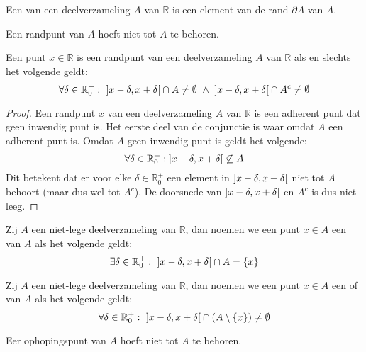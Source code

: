 \documentclass[main.tex]{subfiles}
\begin{document}
\begin{de}
  Een  van een deelverzameling $A$ van $\mathbb{R}$ is een element van de rand $\partial A$ van $A$.
\end{de}

\begin{opm}
  Een randpunt van $A$ hoeft niet tot $A$ te behoren.
\end{opm}

\begin{st}
  Een punt $x\in \mathbb{R}$ is een randpunt van een deelverzameling $A$ van $\mathbb{R}$ als en slechts het volgende geldt:
  \[ \forall \delta \in \mathbb{R}_{0}^{+}:\ \interval[open]{x-\delta}{x+\delta} \cap A \neq \emptyset\ \wedge\  \interval[open]{x-\delta}{x+\delta} \cap A^{c} \neq \emptyset \]

  \begin{proof}
    Een randpunt $x$ van een deelverzameling $A$ van $\mathbb{R}$ is een adherent punt dat geen inwendig punt is.
    Het eerste deel van de conjunctie is waar omdat $A$ een adherent punt is.
    Omdat $A$ geen inwendig punt is geldt het volgende:
    \[ \forall \delta \in \mathbb{R}_{0}^{+}: \interval[open]{x-\delta}{x+\delta} \not\subseteq A \]
    Dit betekent dat er voor elke $\delta \in \mathbb{R}_{0}^{+}$ een element in $\interval[open]{x-\delta}{x+\delta}$ niet tot $A$ behoort (maar dus wel tot $A^{c}$).
    De doorsnede van $\interval[open]{x-\delta}{x+\delta}$ en $A^{c}$ is dus niet leeg.
  \end{proof}
\end{st}

\begin{de}
  Zij $A$ een niet-lege deelverzameling van $\mathbb{R}$, dan noemen we een punt $x\in A$ een  van $A$ als het volgende geldt:
  \[ \exists \delta \in \mathbb{R}_{0}^{+}:\ \interval[open]{x-\delta}{x+\delta} \cap A = \{ x \} \]
\end{de}

\begin{de}
  Zij $A$ een niet-lege deelverzameling van $\mathbb{R}$, dan noemen we een punt $x\in A$ een  of  van $A$ als het volgende geldt:
  \[ \forall \delta \in \mathbb{R}_{0}^{+}:\ \interval[open]{x-\delta}{x+\delta} \cap (A \setminus \{x\}) \neq \emptyset \]
\end{de}

\begin{opm}
  Eer ophopingspunt van $A$ hoeft niet tot $A$ te behoren.
\end{opm}
\end{document}
